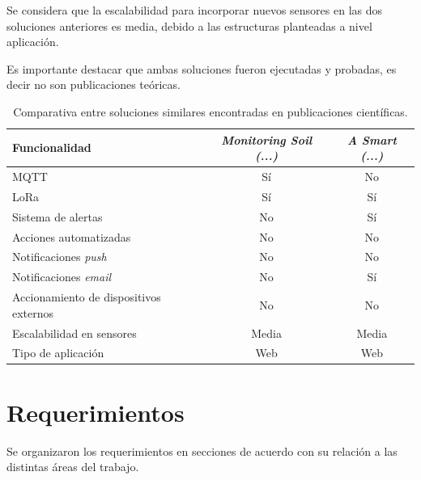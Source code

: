 Se considera que la escalabilidad para incorporar nuevos sensores en las dos soluciones anteriores es media, debido a las estructuras planteadas a nivel aplicación. 

Es importante destacar que ambas soluciones fueron ejecutadas y probadas, es decir no son publicaciones teóricas. 

\begin{table}[H]
	\centering
	\caption[Comparativa entre soluciones similares encontradas en publicaciones científicas]{Comparativa entre soluciones similares encontradas en publicaciones científicas.}
	\begin{tabular}{l c c}    
		\toprule
		\textbf{Funcionalidad} & \textbf{\textit{Monitoring Soil (...)}} & \textbf{\textit{A Smart (...)}}  \\
		\midrule
		MQTT & Sí & No  \\
		LoRa & Sí & Sí  \\
		Sistema de alertas & No & Sí \\
		Acciones automatizadas & No & No \\
		Notificaciones \emph{push} & No & No \\
		Notificaciones \textit{email} & No & Sí \\
		Accionamiento de dispositivos externos & No & No \\
		Escalabilidad en sensores & Media & Media \\
		Tipo de aplicación & Web & Web \\
		\bottomrule
		\hline
	\end{tabular}
	\label{tab:comparativaSolucionesPublicacionesCientificas}
\end{table}


\section{Requerimientos}

Se organizaron los requerimientos en secciones de acuerdo con su relación a las distintas áreas del trabajo.

